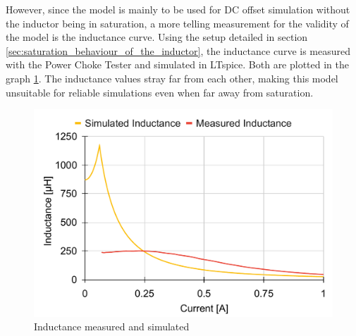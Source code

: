 However, since the model is mainly to be used for \ac{DC} offset simulation without the inductor being in saturation, a more telling measurement for the validity of the model is the inductance curve. Using the setup detailed in section \ref{sec:saturation_behaviour_of_the_inductor}, the inductance curve is measured with the Power Choke Tester and simulated in LTspice. Both are plotted in the graph \ref{fig:inductance_measured_and_simulatd}. The inductance values stray far from each other, making this model unsuitable for reliable simulations even when far away from saturation. 
\begin{figure}[H]
    \centering
    \includegraphics[width=.55\linewidth]{Bilder/Kapitel3/Saturation_Measured_and_Simulated_Hyst.pdf}
    \caption{Inductance measured and simulated}
    \label{fig:inductance_measured_and_simulatd}
\end{figure} 
